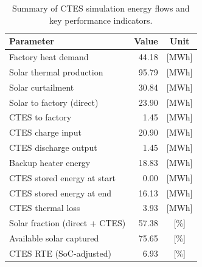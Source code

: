 \renewcommand{\arraystretch}{1.2}
\begin{table}[h]
\centering
\begin{tabular}{l|r c}
\hline
Parameter & Value & Unit \\
\hline
Factory heat demand & 44.18 & [MWh] \\
Solar thermal production & 95.79 & [MWh] \\
Solar curtailment & 30.84 & [MWh] \\
Solar to factory (direct) & 23.90 & [MWh] \\
CTES to factory & 1.45 & [MWh] \\
CTES charge input & 20.90 & [MWh] \\
CTES discharge output & 1.45 & [MWh] \\
Backup heater energy & 18.83 & [MWh] \\
CTES stored energy at start & 0.00 & [MWh] \\
CTES stored energy at end & 16.13 & [MWh] \\
CTES thermal loss & 3.93 & [MWh] \\
\hline
Solar fraction (direct + CTES) & 57.38 & [\%] \\
Available solar captured & 75.65 & [\%] \\
CTES RTE (SoC-adjusted) & 6.93 & [\%] \\
\hline
\end{tabular}
\caption{Summary of CTES simulation energy flows and key performance indicators.}
\label{tab:ctes-simulation-summary}
\end{table}
